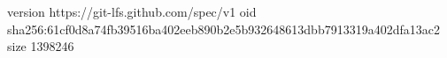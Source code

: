 version https://git-lfs.github.com/spec/v1
oid sha256:61cf0d8a74fb39516ba402eeb890b2e5b932648613dbb7913319a402dfa13ac2
size 1398246
